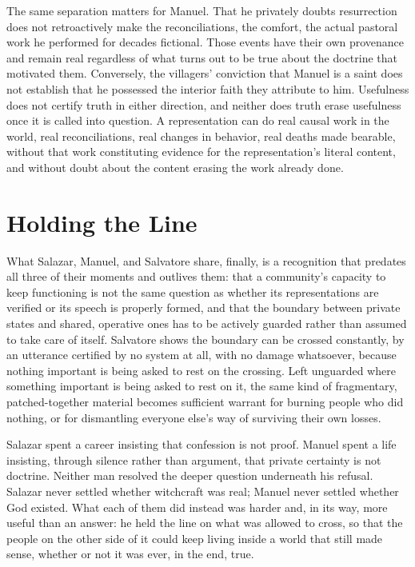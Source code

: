 \documentclass[12pt]{article}
\begin{document}
The same separation matters for Manuel. That he privately doubts resurrection does not retroactively make the reconciliations, the comfort, the actual pastoral work he performed for decades fictional. Those events have their own provenance and remain real regardless of what turns out to be true about the doctrine that motivated them. Conversely, the villagers' conviction that Manuel is a saint does not establish that he possessed the interior faith they attribute to him. Usefulness does not certify truth in either direction, and neither does truth erase usefulness once it is called into question. A representation can do real causal work in the world, real reconciliations, real changes in behavior, real deaths made bearable, without that work constituting evidence for the representation's literal content, and without doubt about the content erasing the work already done.

\section*{Holding the Line}

What Salazar, Manuel, and Salvatore share, finally, is a recognition that predates all three of their moments and outlives them: that a community's capacity to keep functioning is not the same question as whether its representations are verified or its speech is properly formed, and that the boundary between private states and shared, operative ones has to be actively guarded rather than assumed to take care of itself. Salvatore shows the boundary can be crossed constantly, by an utterance certified by no system at all, with no damage whatsoever, because nothing important is being asked to rest on the crossing. Left unguarded where something important is being asked to rest on it, the same kind of fragmentary, patched-together material becomes sufficient warrant for burning people who did nothing, or for dismantling everyone else's way of surviving their own losses. 

Salazar spent a career insisting that confession is not proof. Manuel spent a life insisting, through silence rather than argument, that private certainty is not doctrine. Neither man resolved the deeper question underneath his refusal. Salazar never settled whether witchcraft was real; Manuel never settled whether God existed. What each of them did instead was harder and, in its way, more useful than an answer: he held the line on what was allowed to cross, so that the people on the other side of it could keep living inside a world that still made sense, whether or not it was ever, in the end, true.
\end{document}
